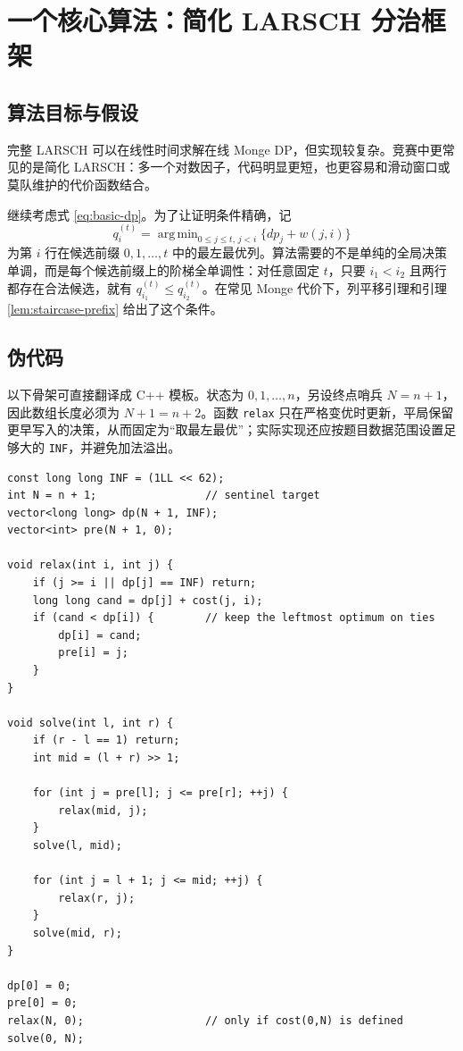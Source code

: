 \documentclass[lang=cn,a4paper,newtx,code=minted,bibtex]{elegantpaper}
\DeclareMathOperator*{\argmin}{arg\,min}
\begin{document}
\section{一个核心算法：简化 LARSCH 分治框架}
\label{sec:algorithm}

\subsection{算法目标与假设}

完整 LARSCH 可以在线性时间求解在线 Monge DP，但实现较复杂。竞赛中更常见的是简化 LARSCH：多一个对数因子，代码明显更短，也更容易和滑动窗口或莫队维护的代价函数结合\cite{noshi2023simplifiedlarsch,luogu2025larsch}。

继续考虑式 \eqref{eq:basic-dp}。为了让证明条件精确，记
\[
  q_i^{(t)}=\argmin_{0\le j\le t,\,j<i}\{dp_j+w(j,i)\}
\]
为第 $i$ 行在候选前缀 $0,1,\ldots,t$ 中的最左最优列。算法需要的不是单纯的全局决策单调，而是每个候选前缀上的阶梯全单调性：对任意固定 $t$，只要 $i_1<i_2$ 且两行都存在合法候选，就有 $q_{i_1}^{(t)}\le q_{i_2}^{(t)}$。在常见 Monge 代价下，列平移引理和引理 \ref{lem:staircase-prefix} 给出了这个条件。

\subsection{伪代码}

以下骨架可直接翻译成 C++ 模板。状态为 $0,1,\ldots,n$，另设终点哨兵 $N=n+1$，因此数组长度必须为 $N+1=n+2$。函数 \lstinline{relax} 只在严格变优时更新，平局保留更早写入的决策，从而固定为“取最左最优”；实际实现还应按题目数据范围设置足够大的 \lstinline{INF}，并避免加法溢出。

\begin{verbatim}
const long long INF = (1LL << 62);
int N = n + 1;                 // sentinel target
vector<long long> dp(N + 1, INF);
vector<int> pre(N + 1, 0);

void relax(int i, int j) {
    if (j >= i || dp[j] == INF) return;
    long long cand = dp[j] + cost(j, i);
    if (cand < dp[i]) {        // keep the leftmost optimum on ties
        dp[i] = cand;
        pre[i] = j;
    }
}

void solve(int l, int r) {
    if (r - l == 1) return;
    int mid = (l + r) >> 1;

    for (int j = pre[l]; j <= pre[r]; ++j) {
        relax(mid, j);
    }
    solve(l, mid);

    for (int j = l + 1; j <= mid; ++j) {
        relax(r, j);
    }
    solve(mid, r);
}

dp[0] = 0;
pre[0] = 0;
relax(N, 0);                   // only if cost(0,N) is defined
solve(0, N);
\end{verbatim}
\end{document}
